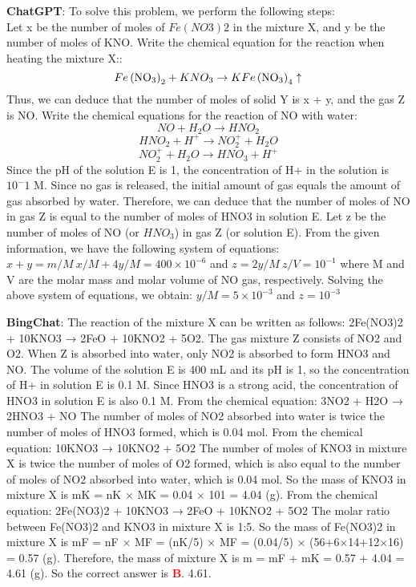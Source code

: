 \documentclass{article}
\begin{document}
{\begin{mdframed}[linewidth=1pt,linecolor=red]
		
		\textbf{ChatGPT}: 
		To solve this problem, we perform the following steps:\\
		Let x be the number of moles of $Fe(NO3)2$ in the mixture X, and y be the number of moles of KNO.
		Write the chemical equation for the reaction when heating the mixture X::
		$$Fe\left({\rm NO}_3\right)_2 + KNO_3 \rightarrow KFe\left({\rm NO}_3\right)_4 \uparrow$$
		Thus, we can deduce that the number of moles of solid Y is x + y, and the gas Z is NO.
		Write the chemical equations for the reaction of NO with water:
		$$NO + H_2O \rightarrow HNO_2$$
		$$HNO_2 + H^+ \rightarrow NO_2^+ + H_2O$$
		$$NO_2^+ + H_2O \rightarrow HNO_3 + H^+$$
		Since the pH of the solution E is 1, the concentration of H+ in the solution is $10^-1$ M. Since no gas is released, the initial amount of gas equals the amount of gas absorbed by water. Therefore, we can deduce that the number of moles of NO in gas Z is equal to the number of moles of HNO3 in solution E.
		Let z be the number of moles of NO (or $HNO_3$) in gas Z (or solution E).
		From the given information, we have the following system of equations:
		$ x + y = m/M \ x/M + 4y/M = 400\times10^{-6} $ and $z = 2y/M \ z/V = 10^{-1}$
		where M and V are the molar mass and molar volume of NO gas, respectively. Solving the above system of equations, we obtain: $y/M = 5\times10^{-3}$ and $z = 10^{-3}$
		
		
		\textbf{BingChat}: The reaction of the mixture X can be written as follows: 2Fe(NO3)2 + 10KNO3 → 2FeO + 10KNO2 + 5O2. The gas mixture Z consists of NO2 and O2. When Z is absorbed into water, only NO2 is absorbed to form HNO3 and NO. The volume of the solution E is 400 mL and its pH is 1, so the concentration of H+ in solution E is 0.1 M. Since HNO3 is a strong acid, the concentration of HNO3 in solution E is also 0.1 M. From the chemical equation: 3NO2 + H2O → 2HNO3 + NO The number of moles of NO2 absorbed into water is twice the number of moles of HNO3 formed, which is 0.04 mol. From the chemical equation: 10KNO3 → 10KNO2 + 5O2 The number of moles of KNO3 in mixture X is twice the number of moles of O2 formed, which is also equal to the number of moles of NO2 absorbed into water, which is 0.04 mol. So the mass of KNO3 in mixture X is mK = nK × MK = 0.04 × 101 = 4.04 (g). From the chemical equation: 2Fe(NO3)2 + 10KNO3 → 2FeO + 10KNO2 + 5O2 The molar ratio between Fe(NO3)2 and KNO3 in mixture X is 1:5. So the mass of Fe(NO3)2 in mixture X is mF = nF × MF = (nK/5) × MF = (0.04/5) × (56+6×14+12×16) = 0.57 (g). Therefore, the mass of mixture X is m = mF + mK = 0.57 + 4.04 = 4.61 (g). So the correct answer is \textcolor{red}{\textbf{B}}. 4.61.
		

\end{mdframed}}
\end{document}
